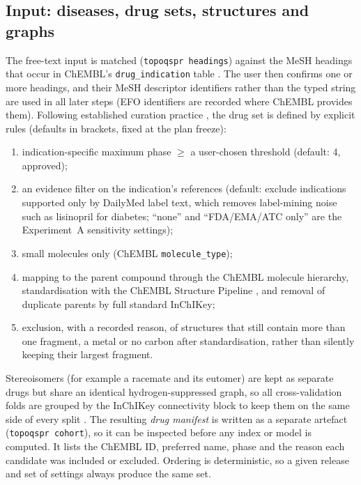 \documentclass[preprint,12pt]{elsarticle}
\begin{document}
\subsection{Input: diseases, drug sets, structures and graphs}
The free-text input is matched (\texttt{topoqspr headings}) against the MeSH headings that occur in ChEMBL's \texttt{drug\_indication} table \cite{zdrazil2024chembl,hunter2025chembl}. The user then confirms one or more headings, and their MeSH \cite{lipscomb2000medical} descriptor identifiers rather than the typed string are used in all later steps (EFO \cite{malone2010modeling} identifiers are recorded where ChEMBL provides them). Following established curation practice \cite{fourches2010trust}, the drug set is defined by explicit rules (defaults in brackets, fixed at the plan freeze):
\begin{enumerate}
  \item indication-specific maximum phase $\geq$ a user-chosen threshold (default: 4, approved);
  \item an evidence filter on the indication's references (default: exclude indications supported only by DailyMed label text, which removes label-mining noise such as lisinopril for diabetes; ``none'' and ``FDA/EMA/ATC only'' are the Experiment~A sensitivity settings);
  \item small molecules only (ChEMBL \texttt{molecule\_type});
  \item mapping to the parent compound through the ChEMBL molecule hierarchy, standardisation with the ChEMBL Structure Pipeline \cite{bento2020open}, and removal of duplicate parents by full standard InChIKey;
  \item exclusion, with a recorded reason, of structures that still contain more than one fragment, a metal or no carbon after standardisation, rather than silently keeping their largest fragment.
\end{enumerate}
Stereoisomers (for example a racemate and its eutomer) are kept as separate drugs but share an identical hydrogen-suppressed graph, so all cross-validation folds are grouped by the InChIKey connectivity block to keep them on the same side of every split \cite{kapoor2023leakage}.
The resulting \emph{drug manifest} is written as a separate artefact (\texttt{topoqspr cohort}), so it can be inspected before any index or model is computed. It lists the ChEMBL ID, preferred name, phase and the reason each candidate was included or excluded. Ordering is deterministic, so a given release and set of settings always produce the same set.
\end{document}
